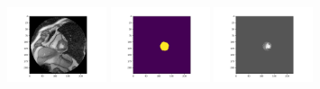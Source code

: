 \documentclass[xcolor=svgnames,handout]{beamer}
\begin{document}
\begin{frame}
\begin{itemize}
\begin{center}
    \end{center}
    
    \begin{center}
        \includegraphics[width=110]{1_image.png}
        \includegraphics[width=110]{1_labels_predict.png}
        \includegraphics[width=110]{1_image_predict.png}
    \end{center}
  \end{itemize}
  \end{frame}
 
\end{document}
